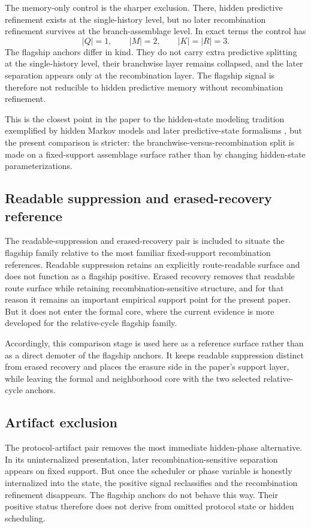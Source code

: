 \documentclass[11pt]{article}
\theoremstyle{definition}
\begin{document}
The memory-only control is the sharper exclusion. There, hidden predictive refinement exists at the single-history level, but no later recombination refinement survives at the branch-assemblage level. In exact terms the control has
\[
|Q| = 1,\qquad |M| = 2,\qquad |K| = |R| = 3.
\]
The flagship anchors differ in kind. They do not carry extra predictive splitting at the single-history level, their branchwise layer remains collapsed, and the later separation appears only at the recombination layer. The flagship signal is therefore not reducible to hidden predictive memory without recombination refinement.

This is the closest point in the paper to the hidden-state modeling tradition exemplified by hidden Markov models and later predictive-state formalisms \cite{Rabiner1989,LittmanSuttonSingh2001,Jaeger2000}, but the present comparison is stricter: the branchwise-versus-recombination split is made on a fixed-support assemblage surface rather than by changing hidden-state parameterizations.

\subsection{Readable suppression and erased-recovery reference}

The readable-suppression and erased-recovery pair is included to situate the flagship family relative to the most familiar fixed-support recombination references. Readable suppression retains an explicitly route-readable surface and does not function as a flagship positive. Erased recovery removes that readable route surface while retaining recombination-sensitive structure, and for that reason it remains an important empirical support point for the present paper. But it does not enter the formal core, where the current evidence is more developed for the relative-cycle flagship family.

Accordingly, this comparison stage is used here as a reference surface rather than as a direct demoter of the flagship anchors. It keeps readable suppression distinct from erased recovery and places the erasure side in the paper's support layer, while leaving the formal and neighborhood core with the two selected relative-cycle anchors.

\subsection{Artifact exclusion}

The protocol-artifact pair removes the most immediate hidden-phase alternative. In its uninternalized presentation, later recombination-sensitive separation appears on fixed support. But once the scheduler or phase variable is honestly internalized into the state, the positive signal reclassifies and the recombination refinement disappears. The flagship anchors do not behave this way. Their positive status therefore does not derive from omitted protocol state or hidden scheduling.
\end{document}
